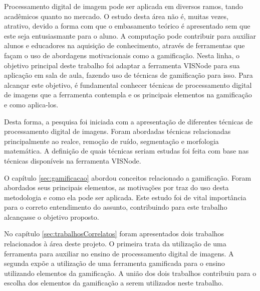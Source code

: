 \documentclass[
	12pt,				%
	oneside,			%
	a4paper,			%
	english,			%
	french,				%
	spanish,			%
	brazil,				%
	]{abntex2}
\begin{document}
Processamento digital de imagem pode ser aplicada em diversos ramos, tando acadêmicos quanto no mercado. O estudo desta área não é, muitas vezes, atrativo, devido a forma com que o embasamento teórico é apresentado sem que este seja entusiasmante para o aluno. A computação pode contribuir para auxiliar alunos e educadores na aquisição de conhecimento, através de ferramentas que façam o uso de abordagens motivacionais como a gamificação. Nesta linha, o objetivo principal deste trabalho foi adaptar a ferramenta VISNode para sua aplicação em sala de aula, fazendo uso de técnicas de gamificação para isso. Para alcançar este objetivo, é fundamental conhecer técnicas de processamento digital de imagens que a ferramenta contempla e os principais elementos na gamificação e como aplica-los.

Desta forma, a pesquisa foi iniciada com a apresentação de diferentes técnicas de processamento digital de imagens. Foram abordadas técnicas relacionadas principalmente ao realce, remoção de ruído, segmentação e morfologia matemática. A definição de quais técnicas seriam estudas foi feita com base nas técnicas disponíveis na ferramenta VISNode.

O capítulo \ref{sec:gamificacao} abordou conceitos relacionado a gamificação. Foram abordados seus principais elementos, as motivações por traz do uso desta metodologia e como ela pode ser aplicada.
Este estudo foi de vital importância para o correto entendimento do assunto, contribuindo para este trabalho alcançasse o objetivo proposto.

No capítulo \ref{sec:trabalhosCorrelatos} foram apresentados dois trabalhos relacionados à área deste projeto. O primeira trata da utilização de uma ferramenta para auxiliar no ensino de processamento digital de imagens. A segunda expõe a utilização de uma ferramenta gamificada para o ensino utilizando elementos da gamificação. A união dos dois trabalhos contribuiu para o escolha dos elementos da gamificação a serem utilizados neste trabalho.

\postextual





\end{document}
